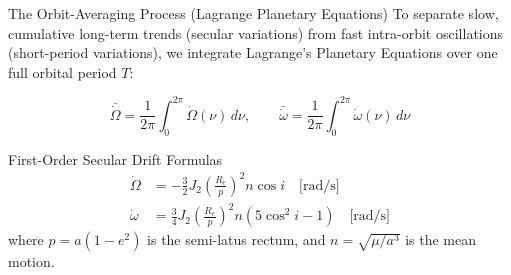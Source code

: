 \documentclass[aspectratio=169,11pt]{beamer}
\begin{document}
\begin{frame}{The Orbit-Averaging Process (Lagrange Planetary Equations)}
    To separate slow, cumulative long-term trends (secular variations) from fast intra-orbit oscillations (short-period variations), we integrate Lagrange's Planetary Equations over one full orbital period $T$:

    \begin{equation*}
        \bar{\dot{\Omega}} = \frac{1}{2\pi} \int_{0}^{2\pi} \dot{\Omega}(\nu) \, d\nu, \qquad 
        \bar{\dot{\omega}} = \frac{1}{2\pi} \int_{0}^{2\pi} \dot{\omega}(\nu) \, d\nu
    \end{equation*}

    \begin{block}{First-Order Secular Drift Formulas}
        \begin{align*}
            \dot{\Omega} &= -\frac{3}{2} J_2 \left(\frac{R_e}{p}\right)^2 n \cos i \quad \text{[rad/s]} \\
            \dot{\omega} &= \frac{3}{4} J_2 \left(\frac{R_e}{p}\right)^2 n \left( 5\cos^2 i - 1 \right) \quad \text{[rad/s]}
        \end{align*}
        where $p = a(1-e^2)$ is the semi-latus rectum, and $n = \sqrt{\mu/a^3}$ is the mean motion.
    \end{block}
\end{frame}
\end{document}
